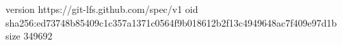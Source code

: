 version https://git-lfs.github.com/spec/v1
oid sha256:ed73748b85409c1c357a1371c0564f9b018612b2f13c4949648ac7f409e97d1b
size 349692
